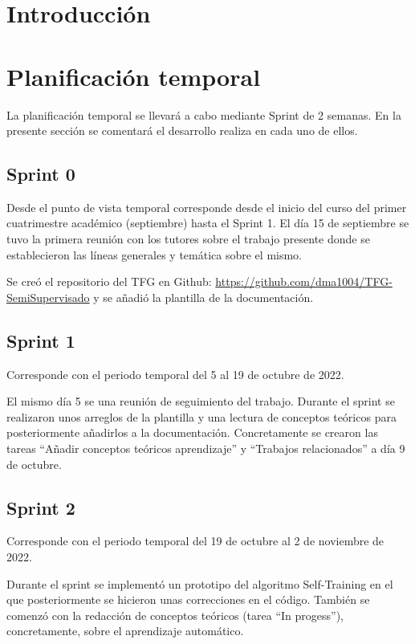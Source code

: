 
\section{Introducción}

\section{Planificación temporal}
La planificación temporal se llevará a cabo mediante Sprint de 2 semanas.
En la presente sección se comentará el desarrollo realiza en cada uno de ellos.

\subsection{Sprint 0}

Desde el punto de vista temporal corresponde desde el inicio del curso del
primer cuatrimestre académico (septiembre) hasta el Sprint 1. El día 15 de
septiembre se tuvo la primera reunión con los tutores sobre el trabajo presente
donde se establecieron las líneas generales y temática sobre el mismo.

Se creó el repositorio del TFG en Github: \url{https://github.com/dma1004/TFG-SemiSupervisado}
y se añadió la plantilla de la documentación.

\subsection{Sprint 1}

Corresponde con el periodo temporal del 5 al 19 de octubre de 2022. 

El mismo día 5 se una reunión de seguimiento del trabajo. Durante el sprint se
realizaron unos arreglos de la plantilla y una lectura de conceptos teóricos
para posteriormente añadirlos a la documentación. Concretamente se crearon las
tareas ``Añadir conceptos teóricos aprendizaje'' y ``Trabajos relacionados'' a
día 9 de octubre.

\subsection{Sprint 2}

Corresponde con el periodo temporal del 19 de octubre al 2 de noviembre de 2022. 

Durante el sprint se implementó un prototipo del algoritmo Self-Training en el
que posteriormente se hicieron unas correcciones en el código. También se
comenzó con la redacción de conceptos teóricos (tarea ``In progess''), concretamente, sobre el
aprendizaje automático.

